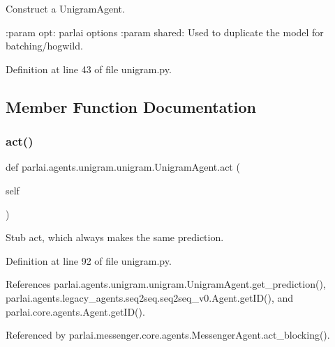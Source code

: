 \begin{DoxyVerb}Construct a UnigramAgent.

:param opt: parlai options
:param shared: Used to duplicate the model for batching/hogwild.
\end{DoxyVerb}
 

Definition at line 43 of file unigram.\+py.



\subsection{Member Function Documentation}
\mbox{\label{classparlai_1_1agents_1_1unigram_1_1unigram_1_1UnigramAgent_a525621d38b382d27fad882ca4a8c682a}} 
\subsubsection{\texorpdfstring{act()}{act()}}
{\footnotesize\ttfamily def parlai.\+agents.\+unigram.\+unigram.\+Unigram\+Agent.\+act (\begin{DoxyParamCaption}\item[{}]{self }\end{DoxyParamCaption})}

\begin{DoxyVerb}Stub act, which always makes the same prediction.
\end{DoxyVerb}
 

Definition at line 92 of file unigram.\+py.



References parlai.\+agents.\+unigram.\+unigram.\+Unigram\+Agent.\+get\+\_\+prediction(), parlai.\+agents.\+legacy\+\_\+agents.\+seq2seq.\+seq2seq\+\_\+v0.\+Agent.\+get\+I\+D(), and parlai.\+core.\+agents.\+Agent.\+get\+I\+D().



Referenced by parlai.\+messenger.\+core.\+agents.\+Messenger\+Agent.\+act\+\_\+blocking().

